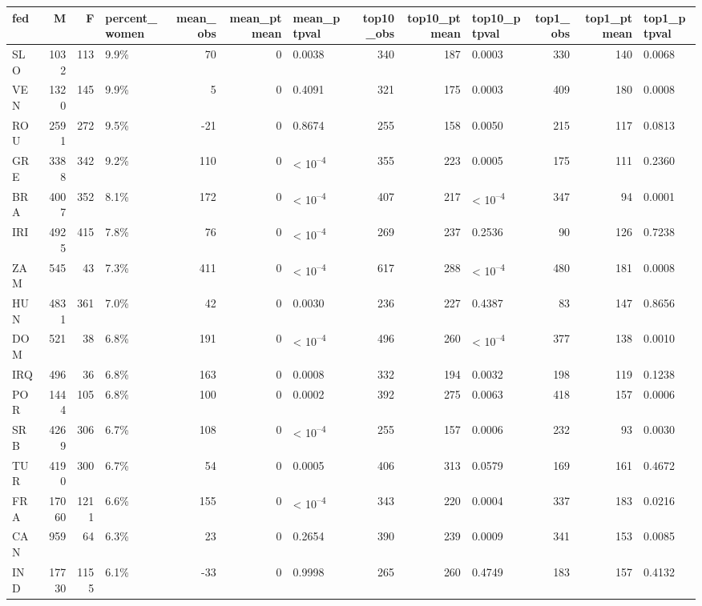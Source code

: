 
\begin{tabular}{l|r|r|l|r|r|l|r|r|l|r|r|l}
\hline
fed & M & F & percent_women & mean_obs & mean_ptmean & mean_ptpval & top10_obs & top10_ptmean & top10_ptpval & top1_obs & top1_ptmean & top1_ptpval\\
\hline
SLO & 1032 & 113 & 9.9\% & 70 & 0 & 0.0038 & 340 & 187 & 0.0003 & 330 & 140 & 0.0068\\
\hline
VEN & 1320 & 145 & 9.9\% & 5 & 0 & 0.4091 & 321 & 175 & 0.0003 & 409 & 180 & 0.0008\\
\hline
ROU & 2591 & 272 & 9.5\% & -21 & 0 & 0.8674 & 255 & 158 & 0.0050 & 215 & 117 & 0.0813\\
\hline
GRE & 3388 & 342 & 9.2\% & 110 & 0 & < 10\textsuperscript{--4} & 355 & 223 & 0.0005 & 175 & 111 & 0.2360\\
\hline
BRA & 4007 & 352 & 8.1\% & 172 & 0 & < 10\textsuperscript{--4} & 407 & 217 & < 10\textsuperscript{--4} & 347 & 94 & 0.0001\\
\hline
IRI & 4925 & 415 & 7.8\% & 76 & 0 & < 10\textsuperscript{--4} & 269 & 237 & 0.2536 & 90 & 126 & 0.7238\\
\hline
ZAM & 545 & 43 & 7.3\% & 411 & 0 & < 10\textsuperscript{--4} & 617 & 288 & < 10\textsuperscript{--4} & 480 & 181 & 0.0008\\
\hline
HUN & 4831 & 361 & 7.0\% & 42 & 0 & 0.0030 & 236 & 227 & 0.4387 & 83 & 147 & 0.8656\\
\hline
DOM & 521 & 38 & 6.8\% & 191 & 0 & < 10\textsuperscript{--4} & 496 & 260 & < 10\textsuperscript{--4} & 377 & 138 & 0.0010\\
\hline
IRQ & 496 & 36 & 6.8\% & 163 & 0 & 0.0008 & 332 & 194 & 0.0032 & 198 & 119 & 0.1238\\
\hline
POR & 1444 & 105 & 6.8\% & 100 & 0 & 0.0002 & 392 & 275 & 0.0063 & 418 & 157 & 0.0006\\
\hline
SRB & 4269 & 306 & 6.7\% & 108 & 0 & < 10\textsuperscript{--4} & 255 & 157 & 0.0006 & 232 & 93 & 0.0030\\
\hline
TUR & 4190 & 300 & 6.7\% & 54 & 0 & 0.0005 & 406 & 313 & 0.0579 & 169 & 161 & 0.4672\\
\hline
FRA & 17060 & 1211 & 6.6\% & 155 & 0 & < 10\textsuperscript{--4} & 343 & 220 & 0.0004 & 337 & 183 & 0.0216\\
\hline
CAN & 959 & 64 & 6.3\% & 23 & 0 & 0.2654 & 390 & 239 & 0.0009 & 341 & 153 & 0.0085\\
\hline
IND & 17730 & 1155 & 6.1\% & -33 & 0 & 0.9998 & 265 & 260 & 0.4749 & 183 & 157 & 0.4132\\

\end{tabular}
